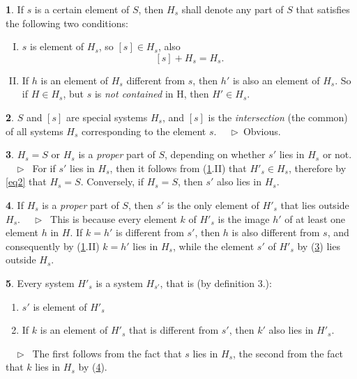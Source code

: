 \documentclass[leqno,hidelinks,a4paper]{article}
\theoremstyle{definition}
\newtheorem{sat}{\protect\satname}
\newtheorem{tef}[sat]{\protect\tefname}
\newcommand{\satname}{}
\newcommand{\tefname}{}
\renewcommand{\satname}{\hspace{-4pt}. Satz}%
\renewcommand{\tefname}{\hspace{-4pt}. Definition}%
\renewcommand{\satname}{\hspace{-4pt}. Theorem}%
\renewcommand{\tefname}{\hspace{-4pt}. Definition}%
\newcommand\Beweis{\newline $ \phantom{'.'} \rhd \ $}%
\newcommand\Prof{ $ \phantom{'.'} \rhd \ $}%
\newcommand{\partof}{\in}
\begin{document}
\begin{paracol}{2}
\newpage

\begin{tef}\label{def3}
If $s$ is a certain element of $S$, then $H_s$ shall denote any part of $S$ that
satisfies the following two conditions:
\vspace{8pt} %

\begin{enumerate}[I.]
\item $s$ is element of $H_s$, so $[s] \partof H_s$, also
\[
	[s] + H_s = H_s.
\]
\item If $h$ is an element of $H_s$ different from $s$, then $h'$ is also an
element of $H_s$. So if $H \partof H_s$, but $s$ is \emph{not contained} in H,
then $H' \partof H_s$.
\end{enumerate}
\end{tef}

\begin{sat}\label{thm4}
$S$ and $[s]$ are special systems $H_s$, and $[s]$ is the \emph{intersection}
(the common) of all systems $H_s$ corresponding to the element $s$.
\Beweis Obvious. \end{sat}

\begin{sat}\label{thm5}
$H_s = S$ or $H_s$ is a \textit{proper} part of $S$, depending on whether  $s'$
lies in $H_s$ or not.
\Beweis
For if $s'$ lies in $H_s$, then it follows from (\ref{def3}.II) that
$H'_s \partof H_s$, therefore by \eqref{eq2} that $H_s = S$. Conversely, if
$H_s = S$, then $s'$ also lies in $H_s$.
\end{sat}

\begin{sat}\label{thm6}
If $H_s$ is a \emph{proper} part of $S$, then $s'$ is the only element of $H'_s$
that lies outside $H_s$.
\Beweis
This is because every element $k$ of $H'_s$ is the image $h'$ of at least one
element $h$ in $H$. If $k=h'$ is different from $s'$, then $h$ is also different
from $s$, and consequently by (\ref{def3}.II) $k = h'$ lies in $H_s$, while the
element $s'$ of $H'_s$ by (\ref{thm5}) lies outside $H_s$.
\end{sat}

\begin{sat}\label{thm7}
Every system $H'_s$ is a system $H_{s'}$, that is (by definition 3.):
\begin{enumerate}[I'.]
	\item $s'$ is element of $H'_s$
	\item If $k$ is an element of $H'_s$ that is different from $s'$, then $k'$
    also lies in $H'_s$.
\end{enumerate}
\Prof
The first follows from the fact that $s$ lies in $H_s$, the second from the fact
that $k$ lies in $H_s$ by (\ref{thm6}).
\end{sat}


\end{paracol}
\end{document}
